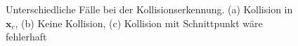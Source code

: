 \begin{figure}[H]
	\label{fig:collision}
	\hspace{-1.8cm}
		\hspace{-2.4cm}
	\centering
	\caption{Unterschiedliche Fälle bei der Kollisionserkennung.
	(a) Kollision in $\textbf{x}_c$, (b) Keine Kollision, (c) Kollision mit Schnittpunkt wäre fehlerhaft}
\end{figure}

